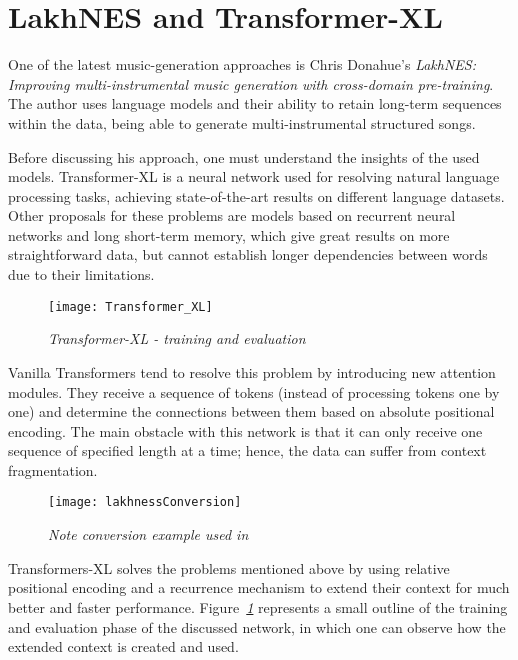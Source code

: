 \section{LakhNES and Transformer-XL}

One of the latest music-generation approaches is Chris Donahue's
\emph{LakhNES: Improving multi-instrumental music generation with cross-domain pre-training}.
The author uses language models and their ability to retain long-term sequences within the data,
being able to generate multi-instrumental structured songs. \cite{donahue2019lakhnes}


Before discussing his approach,
one must understand the insights of the used models.
Transformer-XL is a neural network used for resolving natural language processing tasks,
achieving state-of-the-art results on different language datasets.
Other proposals for these problems are models based on recurrent neural networks and long
short-term memory, which give great results on more straightforward data,
but cannot establish longer dependencies between words due to their limitations. \cite{transformerXLMedium}

\begin{figure}[h]
    \centering
    \texttt{[image: Transformer\_XL]}
    \caption{\emph{Transformer-XL - training and evaluation \cite{transformerXLMedium}}}
    \label{fig:transformerXLMedium}
\end{figure}

Vanilla Transformers tend to resolve this problem by introducing new attention modules.
They receive a sequence of tokens (instead of processing tokens one by one)
and determine the connections between them based on absolute positional encoding.
The main obstacle with this network is that it can only receive
one sequence of specified length at a time;
hence, the data can suffer from context fragmentation. \cite{transformerXLMedium}


\begin{wrapfigure}{L}{0.5\textwidth}
    \centering
    \texttt{[image: lakhnessConversion]}
    \caption{\emph{Note conversion example used in \cite{donahue2019lakhnes}}}
    \label{fig:noteConversion}
\end{wrapfigure}

Transformers-XL solves the problems mentioned above by
using relative positional encoding and a recurrence mechanism
to extend their context for much better and faster performance.
Figure\emph{~\ref{fig:transformerXLMedium}} represents a small outline of the training and evaluation phase of the discussed network,
in which one can observe how the extended context is created and used.





